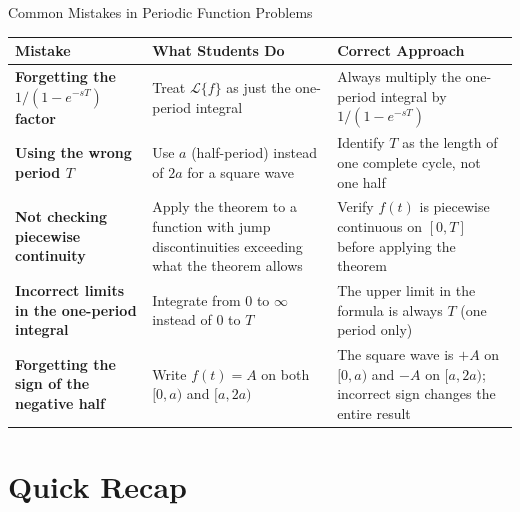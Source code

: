 \documentclass[12pt,a4paper]{article}
\begin{document}
\begin{mistakebox}{Common Mistakes in Periodic Function Problems}
\begin{tabular}{>{\bfseries}p{4.5cm} p{4.5cm} p{5.5cm}}
\toprule
Mistake & What Students Do & Correct Approach \\
\midrule
Forgetting the $1/(1-e^{-sT})$ factor
  & Treat $\mathcal{L}\{f\}$ as just the one-period integral
  & Always multiply the one-period integral by $1/(1-e^{-sT})$ \\[6pt]
Using the wrong period $T$
  & Use $a$ (half-period) instead of $2a$ for a square wave
  & Identify $T$ as the length of one complete cycle, not one half \\[6pt]
Not checking piecewise continuity
  & Apply the theorem to a function with jump discontinuities exceeding what the theorem allows
  & Verify $f(t)$ is piecewise continuous on $[0,T]$ before applying the theorem \\[6pt]
Incorrect limits in the one-period integral
  & Integrate from $0$ to $\infty$ instead of $0$ to $T$
  & The upper limit in the formula is always $T$ (one period only) \\[6pt]
Forgetting the sign of the negative half
  & Write $f(t) = A$ on both $[0,a)$ and $[a,2a)$
  & The square wave is $+A$ on $[0,a)$ and $-A$ on $[a,2a)$; incorrect sign changes the entire result \\
\bottomrule
\end{tabular}
\end{mistakebox}

\section{Quick Recap}
\end{document}
